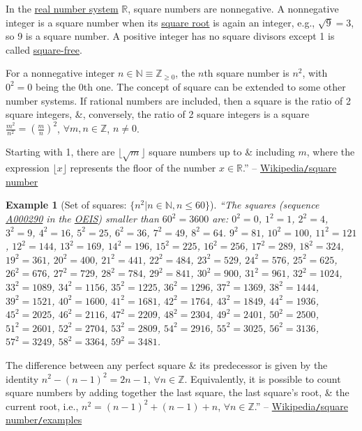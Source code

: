 \documentclass{article}
\newtheorem{example}{Example}
\begin{document}
In the \href{https://en.wikipedia.org/wiki/Real_number}{real number system} $\mathbb{R}$, square numbers are nonnegative. A nonnegative integer is a square number when its \href{https://en.wikipedia.org/wiki/Square_root}{square root} is again an integer, e.g., $\sqrt{9} = 3$, so 9 is a square number. A positive integer has no square divisors except 1 is called \href{https://en.wikipedia.org/wiki/Square-free_integer}{square-free}.

For a nonnegative integer $n\in\mathbb{N}\equiv\mathbb{Z}_{\ge0}$, the $n$th square number is $n^2$, with $0^2 = 0$ being the 0th one. The concept of square can be extended to some other number systems. If rational numbers are included, then a square is the ratio of 2 square integers, \&, conversely, the ratio of 2 square integers is a square $\frac{m^2}{n^2} = \left(\frac{m}{n}\right)^2$, $\forall m,n\in\mathbb{Z}$, $n\ne0$.

Starting with 1, there are $\lfloor\sqrt{m}\rfloor$ square numbers up to \& including $m$, where the expression $\lfloor x\rfloor$ represents the floor of the number $x\in\mathbb{R}$.'' -- \href{https://en.wikipedia.org/wiki/Square_number}{Wikipedia\texttt{/}square number}

\begin{example}[Set of squares: $\{n^2|n\in\mathbb{N},n\le60\}$]
	``The squares (sequence \href{https://oeis.org/A000290}{A000290} in the \href{https://en.wikipedia.org/wiki/On-Line_Encyclopedia_of_Integer_Sequences}{OEIS}) smaller than $60^2 = 3600$ are: $0^2 = 0$, $1^2 = 1$, $2^2 = 4$, $3^2 = 9$, $4^2 = 16$, $5^2 = 25$, $6^2 = 36$, $7^2 = 49$, $8^2 = 64$. $9^2 = 81$, $10^2 = 100$, $11^2 = 121$, $12^2 = 144$, $13^2 = 169$, $14^2 = 196$, $15^2 = 225$, $16^2 = 256$, $17^2 = 289$, $18^2 = 324$, $19^2 = 361$, $20^2 = 400$, $21^2 = 441$, $22^2 = 484$, $23^2 = 529$, $24^2 = 576$, $25^2 = 625$, $26^2 =  676$, $27^2 = 729$, $28^2 = 784$, $29^2 = 841$, $30^2 = 900$, $31^2 = 961$, $32^2 = 1024$, $33^2 = 1089$, $34^2 = 1156$, $35^2 = 1225$, $36^2 = 1296$, $37^2 = 1369$, $38^2 = 1444$, $39^2 = 1521$, $40^2 = 1600$, $41^2 = 1681$, $42^2 = 1764$, $43^2 = 1849$, $44^2 = 1936$, $45^2 = 2025$, $46^2 = 2116$, $47^2 = 2209$, $48^2 = 2304$, $49^2 = 2401$, $50^2 = 2500$, $51^2 = 2601$, $52^2 = 2704$, $53^2 = 2809$, $54^2 = 2916$, $55^2 = 3025$, $56^2 = 3136$, $57^2 = 3249$, $58^2 = 3364$, $59^2 = 3481$.
\end{example}
The difference between any perfect square \& its predecessor is given by the identity $n^2 - (n - 1)^2 = 2n - 1$, $\forall n\in\mathbb{Z}$. Equivalently, it is possible to count square numbers by adding together the last square, the last square's root, \& the current root, i.e., $n^2 = (n - 1)^2 + (n - 1) + n$, $\forall n\in\mathbb{Z}$.'' -- \href{https://en.wikipedia.org/wiki/Square_number#Examples}{Wikipedia\texttt{/}square number\texttt{/}examples}
\end{document}
